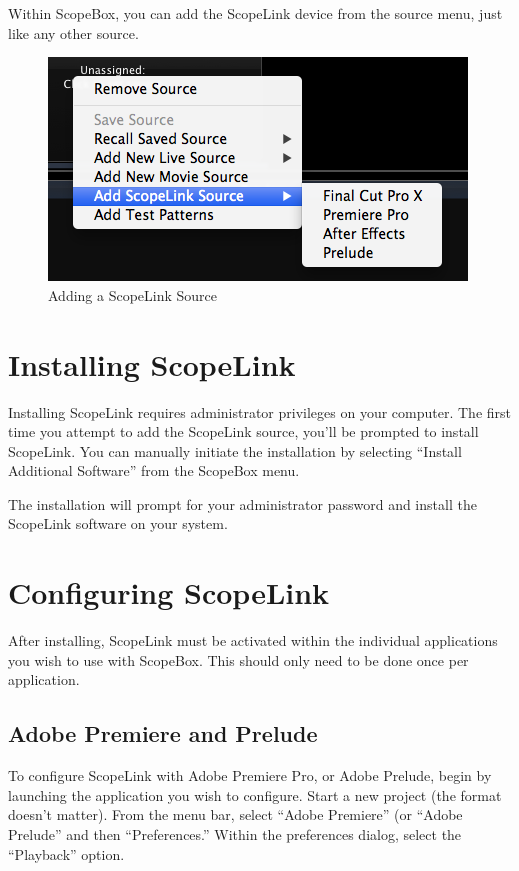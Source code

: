 \documentclass[10,letterpaper,]{report}
\begin{document}
Within ScopeBox, you can add the ScopeLink device from the source menu,
just like any other source.

\begin{figure}[htbp]
\centering
\includegraphics{images/scopelinkSource.png}
\caption{Adding a ScopeLink Source}
\end{figure}

\section{Installing ScopeLink}

Installing ScopeLink requires administrator privileges on your computer.
The first time you attempt to add the ScopeLink source, you'll be
prompted to install ScopeLink. You can manually initiate the
installation by selecting ``Install Additional Software'' from the
ScopeBox menu.

The installation will prompt for your administrator password and install
the ScopeLink software on your system.

\section{Configuring ScopeLink}

After installing, ScopeLink must be activated within the individual
applications you wish to use with ScopeBox. This should only need to be
done once per application.

\subsection{Adobe Premiere and Prelude}

To configure ScopeLink with Adobe Premiere Pro, or Adobe Prelude, begin
by launching the application you wish to configure. Start a new project
(the format doesn't matter). From the menu bar, select ``Adobe
Premiere'' (or ``Adobe Prelude'' and then ``Preferences.'' Within the
preferences dialog, select the ``Playback'' option.
\end{document}

